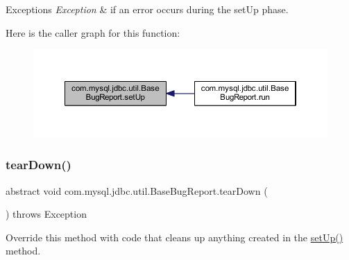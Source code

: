 \begin{DoxyExceptions}{Exceptions}
{\em Exception} & if an error occurs during the \textquotesingle{}set\+Up\textquotesingle{} phase. \\
\hline
\end{DoxyExceptions}
Here is the caller graph for this function\+:
\nopagebreak
\begin{figure}[H]
\begin{center}
\leavevmode
\includegraphics[width=350pt]{classcom_1_1mysql_1_1jdbc_1_1util_1_1_base_bug_report_aad06cc210e16377a2837266b087ea2ce_icgraph}
\end{center}
\end{figure}
\mbox{\label{classcom_1_1mysql_1_1jdbc_1_1util_1_1_base_bug_report_a7fd16c03e3e8778c75cb64274e1349de}} 
\subsubsection{\texorpdfstring{tear\+Down()}{tearDown()}}
{\footnotesize\ttfamily abstract void com.\+mysql.\+jdbc.\+util.\+Base\+Bug\+Report.\+tear\+Down (\begin{DoxyParamCaption}{ }\end{DoxyParamCaption}) throws Exception\hspace{0.3cm}{\ttfamily [abstract]}}

Override this method with code that cleans up anything created in the \mbox{\hyperlink{classcom_1_1mysql_1_1jdbc_1_1util_1_1_base_bug_report_aad06cc210e16377a2837266b087ea2ce}{set\+Up()}} method.


